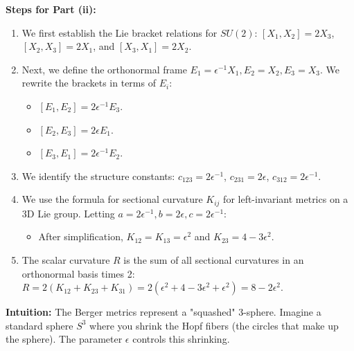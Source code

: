 \begin{solution}
\textbf{Steps for Part (ii):}
\begin{enumerate}
    \item We first establish the Lie bracket relations for $SU(2)$: $[X_1, X_2] = 2X_3$, $[X_2, X_3] = 2X_1$, and $[X_3, X_1] = 2X_2$.
    \item Next, we define the orthonormal frame $E_1 = \epsilon^{-1}X_1, E_2 = X_2, E_3 = X_3$. We rewrite the brackets in terms of $E_i$:
    \begin{itemize}
        \item $[E_1, E_2] = 2\epsilon^{-1}E_3$.
        \item $[E_2, E_3] = 2\epsilon E_1$.
        \item $[E_3, E_1] = 2\epsilon^{-1}E_2$.
    \end{itemize}
    \item We identify the structure constants: $c_{123} = 2\epsilon^{-1}$, $c_{231} = 2\epsilon$, $c_{312} = 2\epsilon^{-1}$.
    \item We use the formula for sectional curvature $K_{ij}$ for left-invariant metrics on a 3D Lie group. Letting $a=2\epsilon^{-1}, b=2\epsilon, c=2\epsilon^{-1}$:
    \begin{itemize}
        \item After simplification, $K_{12} = K_{13} = \epsilon^2$ and $K_{23} = 4 - 3\epsilon^2$.
    \end{itemize}
    \item The scalar curvature $R$ is the sum of all sectional curvatures in an orthonormal basis times 2: $R = 2(K_{12} + K_{23} + K_{31}) = 2(\epsilon^2 + 4 - 3\epsilon^2 + \epsilon^2) = 8 - 2\epsilon^2$.
\end{enumerate}

\textbf{Intuition:}
The Berger metrics represent a "squashed" 3-sphere. Imagine a standard sphere $S^3$ where you shrink the Hopf fibers (the circles that make up the sphere). The parameter $\epsilon$ controls this shrinking.


\end{solution}
